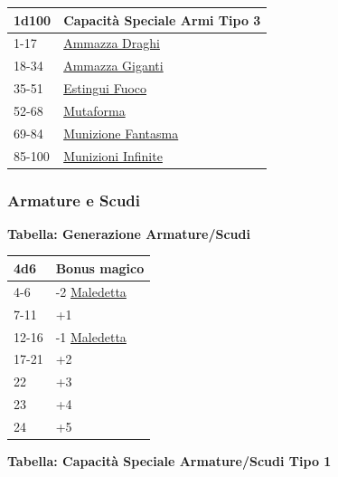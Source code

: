 \begin{multicols}{2}
{\medskip

{\small\begin{tabularx}{\linewidth}{ll}
		\toprule
\rowcolor{gray!20}\textbf{1d100} & \textbf{Capacità Speciale Armi Tipo 3}\\
\toprule
1-17 & \hyperlink{Ammazza Draghi}{Ammazza Draghi}\\
\rowcolor{gray!20}18-34 & \hyperlink{Ammazza Giganti}{Ammazza Giganti}\\
35-51 & \hyperlink{Estingui Fuoco}{Estingui Fuoco}\\
\rowcolor{gray!20}52-68 & \hyperlink{Mutaforma}{Mutaforma}\\
69-84 & \hyperlink{Munizione Fantasma}{Munizione Fantasma}\\
\rowcolor{gray!20}85-100 & \hyperlink{Munizioni Infinite}{Munizioni Infinite}\\
\end{tabularx}}


\subsubsection{Armature e Scudi}

\textbf{Tabella: Generazione Armature/Scudi}\hypertarget{armatureescudi}{}\label{armatureescudi}

\medskip

{\small\begin{tabularx}{\linewidth}{ll}
		\toprule
  \rowcolor{gray!20}\textbf{4d6} & \textbf{Bonus magico}\\
\toprule
		4-6 & -2 \hyperlink{Armatura maledetta}{Maledetta}\\
  \rowcolor{gray!20}7-11 &+1\\
		12-16 & -1 \hyperlink{Armatura maledetta}{Maledetta}\\
  \rowcolor{gray!20}17-21 & +2\\
		22 & +3\\
  \rowcolor{gray!20}23 & +4\\
		24 &+5\\
\end{tabularx}}

\medskip

\textbf{Tabella: Capacità Speciale Armature/Scudi Tipo 1}\hypertarget{Capacità Speciale Armature / Scudi Tipo 1}{}

}
\end{multicols}
